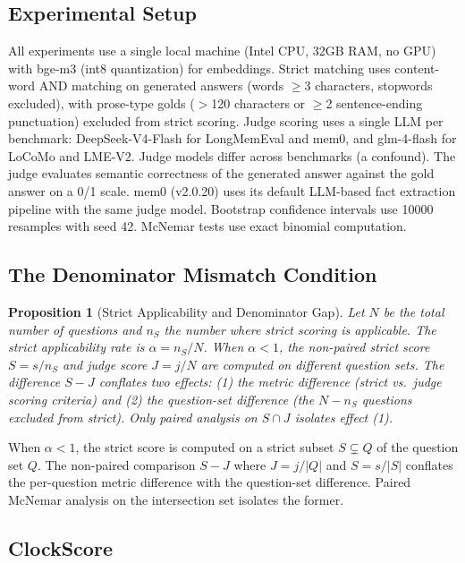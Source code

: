\documentclass{llncs}
\newtheorem{propositionx}{Proposition}
\begin{document}
\subsection{Experimental Setup}
All experiments use a single local machine (Intel CPU, 32GB RAM, no GPU) with bge-m3 (int8 quantization) for embeddings. Strict matching uses content-word AND matching on generated answers (words $\geq$3 characters, stopwords excluded), with prose-type golds ($>$120 characters or $\geq$2 sentence-ending punctuation) excluded from strict scoring. Judge scoring uses a single LLM per benchmark: DeepSeek-V4-Flash for LongMemEval and mem0, and glm-4-flash for LoCoMo and LME-V2. Judge models differ across benchmarks (a confound). The judge evaluates semantic correctness of the generated answer against the gold answer on a 0/1 scale. mem0 (v2.0.20) uses its default LLM-based fact extraction pipeline with the same judge model. Bootstrap confidence intervals use 10{}000 resamples with seed 42. McNemar tests use exact binomial computation.

\subsection{The Denominator Mismatch Condition}

\begin{propositionx}[Strict Applicability and Denominator Gap]

Let $N$ be the total number of questions and $n_S$ the number where strict scoring is applicable. The strict applicability rate is $\alpha = n_S / N$. When $\alpha < 1$, the non-paired strict score $S = s/n_S$ and judge score $J = j/N$ are computed on different question sets. The difference $S - J$ conflates two effects: (1) the metric difference (strict vs.\ judge scoring criteria) and (2) the question-set difference (the $N - n_S$ questions excluded from strict). Only paired analysis on $S \cap J$ isolates effect (1).
\end{propositionx}
When $\alpha < 1$, the strict score is computed on a strict subset $S \subsetneq Q$ of the question set $Q$. The non-paired comparison $S - J$ where $J = j/|Q|$ and $S = s/|S|$ conflates the per-question metric difference with the question-set difference. Paired McNemar analysis on the intersection set isolates the former.

\subsection{ClockScore}
\end{document}
